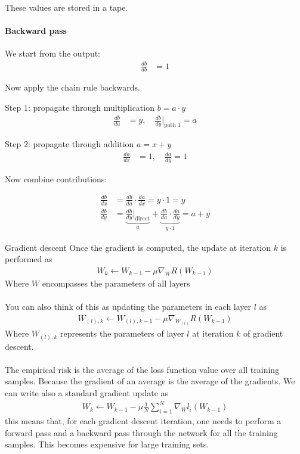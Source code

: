 These values are stored in a tape.

\paragraph{Backward pass}

We start from the output:
\begin{align*}
\frac{db}{db} &= 1
\end{align*}

Now apply the chain rule backwards.

Step 1: propagate through multiplication $b = a \cdot y$
\begin{align*}
\frac{db}{da} &= y, \quad \frac{db}{dy}\Big|_{\text{path 1}} = a
\end{align*}

Step 2: propagate through addition $a = x + y$
\begin{align*}
\frac{da}{dx} &= 1, \quad \frac{da}{dy} = 1
\end{align*}

Now combine contributions:

\begin{align*}
\frac{db}{dx} &= \frac{db}{da} \cdot \frac{da}{dx} = y \cdot 1 = y \\
\frac{db}{dy} &= \underbrace{\frac{db}{dy}\Big|_{\text{direct}}}_{a} + \underbrace{\frac{db}{da} \cdot \frac{da}{dy}}_{y \cdot 1}
= a + y
\end{align*}



\begin{parag}{Gradient descent}
    Once the gradient is computed, the update at iteration $k$ is performed as 
	\begin{align*} 
		W_k \leftarrow W_{k-1} - \mu \nabla_W R\left(W_{k-1}\right)
	\end{align*}
	Where $W$ encompasses the parameters of all layers\\
	$ $\\
	You can also think of this as updating the parameters in each layer $l$ as 
	\begin{align*} 
		W_{\left(l\right), k} \leftarrow W_{\left(l\right), k - 1} - \mu \nabla_{W_{\left(l\right)}}R\left(W_{k - 1}\right)
	\end{align*}
	Where $W_{\left(l\right), k}$ represents the parameters of layer $l$ at iteration $k$ of gradient descent.\\
	$ $\\
	The empirical risk is the average of the loss function value over all training samples. Because the gradient of an average is the average of the gradients. We can write also a standard gradient update as 
	\begin{align*} 
		W_{k} \leftarrow W_{k-1} - \mu \frac{1}{N}\sum_{i= 1}^{N}\nabla_W l_i\left(W_{k-1}\right)
	\end{align*}
	this means that, for each gradient descent iteration, one needs to perform a forward pass and a backward pass through the network for all the training samples. This becomes expensive for large training sets. 
\end{parag}

